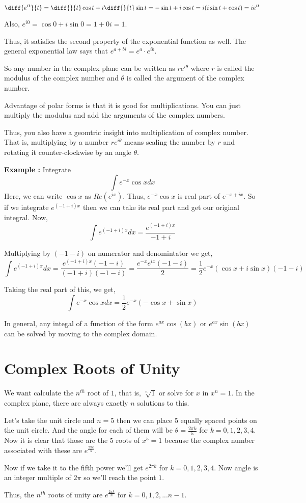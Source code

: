 $$
\diff{e^{i t}}{t} = \diff{}{t} \cos t + i \diff{}{t} \sin t
	= - \sin t + i \cos t
	= i ( i \sin t + \cos t)
	= i e^{it}
$$

Also, $e^{i 0} = \cos 0 + i \sin 0 = 1 + 0 i = 1 $.

Thus, it satisfies the second property of the exponential function as well.
The general exponential law says that $e^{a+bi} = e^a \cdot e^{ib}$.

So any number in the complex plane can be written as $re^{i \theta}$
where $r$ is called the modulus of the complex number 
and $\theta$ is called the argument of the complex number.

Advantage of polar forms is that it is good for multiplications. 
You can just multiply the modulus and add the arguments of the complex numbers.

Thus, you also have a geomtric insight into multiplication of complex number.
That is, multiplying by a number $r e^{i \theta}$ means scaling the number by $r$ 
and rotating it counter-clockwise by an angle $\theta$.


{\bf Example : } Integrate 
$$ \int e^{-x} \cos x dx $$
Here, we can write $\cos x$ as $Re(e^{ix})$. 
Thus, $e^{-x} \cos x$ is real part of $e^{-x + ix}$.
So if we integrate $e^{(-1+i)x}$ then we can take its real part and get our original integral.
Now, 
$$
\int e^{(-1+i)x} dx = \frac{e^{(-1+i)x}}{-1+i}
$$

Multiplying by $(-1-i)$ on numerator and denomintator we get, 
$$
\int e^{(-1+i)x} dx = \frac{ e^{(-1+i)x} (-1-i) }{(-1+i)(-1-i)}
= \frac{ e^{-x}e^{ix}(-1-i) }{ 2 }
= \frac{1}{2} e^{-x} (\cos x + i \sin x)(-1-i)
$$

Taking the real part of this, we get,
$$ 
\int e^{-x} \cos x dx 
	= \frac{1}{2} e^{-x} ( - \cos x + \sin x) 
$$

In general, any integal of a function of the form $e^{ax} \cos (bx)$ or $e^{ax} \sin (bx)$ 
can be solved by moving to the complex domain.


\section{Complex Roots of Unity}

We want calculate the $n^{th}$ root of $1$, that is, $\sqrt[n]{1}$ or solve for $x$ in $x^n = 1$.
In the complex plane, there are always exactly $n$ solutions to this.

Let's take the unit circle and $n = 5$ then we can place 5 equally spaced points on the unit circle.
And the angle for each of them will be $\theta = \frac{2 \pi k}{5}$ for $k = 0, 1, 2, 3, 4$.
Now it is clear that those are the 5 roots of $x^5 = 1$ because the complex number associated with these
are $e^{\frac{2 \pi k}{5}}$. 

Now if we take it to the fifth power we'll get $e^{2 \pi k}$ for $k = 0, 1, 2, 3, 4$.
Now angle is an integer multiple of $2 \pi$ so we'll reach the point $1$. 

Thus, the $n^{th}$ roots of unity are $e^{\frac{2 \pi k}{n}}$ for $k = 0, 1, 2, ... n-1$.


